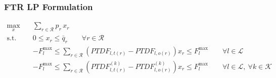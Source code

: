 \documentclass[
    11pt,
]{beamer}
\begin{document}
\begin{frame}
    \frametitle{FTR LP Formulation}
    \footnotesize

    \begin{align*}
        \max_{x}\quad
        & \sum_{r\in\mathcal R} p_r\,x_r \\[6pt]
        \text{s.t.}\quad
        & 0 \le x_r \le \bar q_r
        \qquad \forall r\in\mathcal R \\[6pt]
        & -F_l^{\max}
        \le
        \sum_{r\in\mathcal R}
        \left( PTDF_{l,t(r)} - PTDF_{l,o(r)} \right)x_r
        \le
        F_l^{\max}
        \qquad \forall l\in\mathcal L \\[6pt]
        & -F_l^{\max}
        \le
        \sum_{r\in\mathcal R}
        \left( PTDF^{(k)}_{l,t(r)} - PTDF^{(k)}_{l,o(r)} \right)x_r
        \le
        F_l^{\max}
        \qquad \forall l\in\mathcal L,\ \forall k\in\mathcal K
        \end{align*}
\end{frame}



\end{document}
